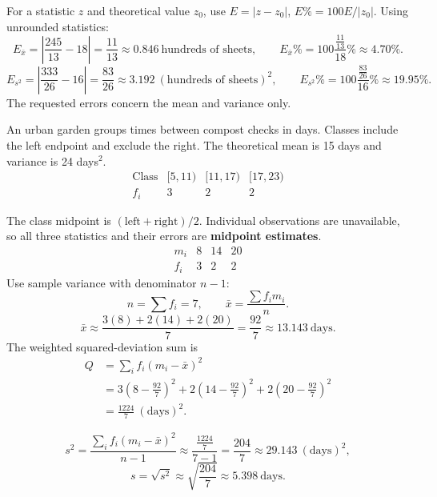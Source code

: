 For a statistic $z$ and theoretical value $z_0$, use $E=|z-z_0|$, $E\%=100E/|z_0|$.
Using unrounded statistics:
\[E_{\bar x}=\left|\frac{245}{13}-18\right|=\frac{11}{13}\approx0.846\ \text{hundreds of sheets},\qquad E_{\bar x}\%=100\frac{\frac{11}{13}}{18}\%\approx4.70\%.\]
\[E_{s^2}=\left|\frac{333}{26}-16\right|=\frac{83}{26}\approx3.192\ (\text{hundreds of sheets})^2,\qquad E_{s^2}\%=100\frac{\frac{83}{26}}{16}\%\approx19.95\%.\]
The requested errors concern the mean and variance only.

An urban garden groups times between compost checks in days. Classes include the left endpoint and exclude the right. The theoretical mean is 15 days and variance is 24 days$^2$.
\[\begin{array}{c|rrr}\text{Class}&[5,11)&[11,17)&[17,23)\\\hline f_i&3&2&2\end{array}\]


\Needspace{13cm}

The class midpoint is $(\text{left}+\text{right})/2$. Individual observations are unavailable, so all three statistics and their errors are \textbf{midpoint estimates}.\[\begin{array}{c|rrr}m_i&8&14&20\\\hline f_i&3&2&2\end{array}\]
Use sample variance with denominator $n-1$:
\[n=\sum f_i=7,\qquad\bar x=\frac{\sum f_im_i}{n}.\]
\[\bar x\approx\frac{3(8)+2(14)+2(20)}{7}=\frac{92}{7}\approx13.143\ \mathrm{days}.\]
The weighted squared-deviation sum is
\[\begin{aligned}Q&=\sum_i f_i(m_i-\bar x)^2\\&=3\left(8-\frac{92}{7}\right)^2+2\left(14-\frac{92}{7}\right)^2+2\left(20-\frac{92}{7}\right)^2\\&=\frac{1224}{7}\ (\mathrm{days})^2.\end{aligned}\]
\begin{samepage}
\[s^2=\frac{\sum_i f_i(m_i-\bar x)^2}{n-1}\approx\frac{\frac{1224}{7}}{7-1}=\frac{204}{7}\approx29.143\ (\mathrm{days})^2,\]
\[s=\sqrt{s^2}\approx\sqrt{\frac{204}{7}}\approx5.398\ \mathrm{days}.\]
\end{samepage}

